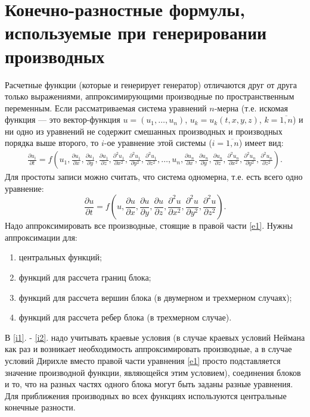 \documentclass[a4paper]{article}
\begin{document}
\section{\LARGE Конечно-разностные формулы, используемые при генерировании производных}
Расчетные функции (которые и генерирует генератор) отличаются друг от друга только выражениями, аппроксимирующими производные по пространственным пе\-ре\-мен\-ным. Если рассматриваемая система уравнений $n$-мерна (т.е. искомая функция --- это вектор-функция $u = (u_1, \ldots, u_n)$, $u_k = u_k(t,x,y,z)$, $k=\overline{1,n}$) и ни одно из уравнений не содержит смешанных производных и производных порядка выше вто\-ро\-го, то $i$-ое уравнение этой системы ($i = \overline{1,n}$) имеет вид:
\begin{multline*}
\frac{\partial u_i}{\partial t} = f\left(u_1, \frac{\partial u_1}{\partial x}, \frac{\partial u_1}{\partial y}, \frac{\partial u_1}{\partial z}, \frac{\partial^2 u_1}{\partial x^2}, \frac{\partial^2 u_1}{\partial y^2}, \frac{\partial^2 u_1}{\partial z^2}, \ldots , u_n, \frac{\partial u_n}{\partial x}, \frac{\partial u_n}{\partial y}, \frac{\partial u_n}{\partial z}, \frac{\partial^2 u_n}{\partial x^2}, \frac{\partial^2 u_n}{\partial y^2}, \frac{\partial^2 u_n}{\partial z^2} \right).
\end{multline*} 
Для простоты записи можно считать, что система одномерна, т.е. есть всего одно уравнение:
\begin{equation}\label{e1}
\frac{\partial u}{\partial t} = f\left(u, \frac{\partial u}{\partial x}, \frac{\partial u}{\partial y}, \frac{\partial u}{\partial z}, \frac{\partial^2 u}{\partial x^2}, \frac{\partial^2 u}{\partial y^2}, \frac{\partial^2 u}{\partial z^2}\right).
\end{equation} 
Надо аппроксимировать все производные, стоящие в правой части \eqref{e1}. Нужны аппро\-кси\-ма\-ции для:
\begin{enumerate}
\item центральных функций;
\item функций для рассчета границ блока; \label {i1}
\item функций для рассчета вершин блока (в двумерном и трехмерном случаях);
\item функций для рассчета ребер блока (в трехмерном случае). \label{i2}
\end{enumerate}
В \ref{i1}. - \ref{i2}. надо учитывать краевые условия (в случае краевых условий Неймана как раз и возникает необходимость аппроксимировать производные, а в случае условий Дирихле вместо правой части уравнения \eqref{e1} просто подставляется значение про\-из\-вод\-ной функции, являющейся этим условием), соединения блоков и то, что на разных частях одного блока могут быть заданы разные уравнения. Для приближения про\-из\-вод\-ных во всех функциях используются центральные конечные разности.
\end{document}
